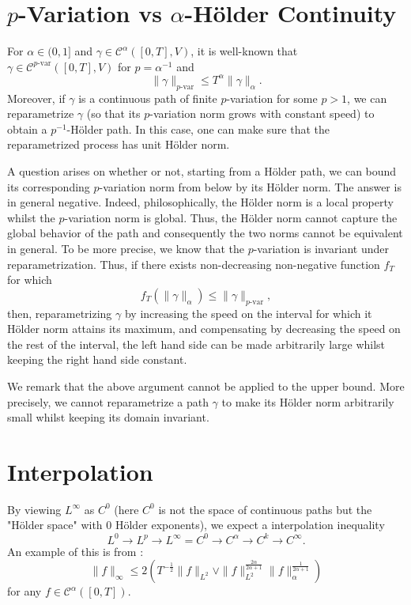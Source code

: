 \documentclass[]{article}
\theoremstyle{definition}
\theoremstyle{definition}
\def\pvar{p\mathrm{\text{-}var}}
\begin{document}



\section*{\(p\)-Variation vs \(\alpha\)-H\"older Continuity}

For \(\alpha \in (0, 1]\) and \(\gamma \in \mathcal{C}^\alpha([0, T], V)\), it is well-known that 
\(\gamma \in \mathcal{C}^{\pvar}([0, T], V)\) for \(p = \alpha^{-1}\) and 
\[\|\gamma\|_{\pvar} \le T^\alpha \|\gamma\|_\alpha.\]
Moreover, if \(\gamma\) is a continuous path of finite \(p\)-variation for some \(p > 1\), we 
can reparametrize \(\gamma\) (so that its \(p\)-variation norm grows with constant speed) to 
obtain a \(p^{-1}\)-H\"older path. In this case, one can make sure that the reparametrized process 
has unit H\"older norm. 

A question arises on whether or not, starting from a H\"older path, we can bound its corresponding 
\(p\)-variation norm from below by its H\"older norm. The answer is in general negative. Indeed, 
philosophically, the H\"older norm is a local property whilst the \(p\)-variation norm is global. 
Thus, the H\"older norm cannot capture the global behavior of the path and consequently the two 
norms cannot be equivalent in general. To be more precise, we know that the \(p\)-variation is 
invariant under reparametrization. Thus, if there exists non-decreasing non-negative function \(f_T\) for which 
\[f_T(\|\gamma\|_{\alpha}) \le \|\gamma\|_{\pvar},\]
then, reparametrizing \(\gamma\) by increasing the speed on the interval for which it H\"older norm 
attains its maximum, and compensating by decreasing the speed on the rest of the interval, the 
left hand side can be made arbitrarily large whilst keeping the right hand side constant. 

We remark that the above argument cannot be applied to the upper bound. More precisely, we cannot 
reparametrize a path \(\gamma\) to make its H\"older norm arbitrarily small whilst keeping its 
domain invariant. 

\section*{Interpolation}

By viewing \(L^\infty\) as \(C^0\) (here \(C^0\) is not the space of continuous paths but the 
"H\"older space" with 0 H\"older exponents), we expect a interpolation inequality 
\[L^0 \to L^p \to L^\infty = C^0 \to C^\alpha \to C^k \to C^\infty.\]
An example of this is from \cite[Lemma A.3]{Hairer:10}:
\[\|f\|_\infty \le 2 \left(T^{-\frac{1}{2}} \|f\|_{L^2} \vee 
  \|f\|_{L^2}^{\frac{2\alpha}{2\alpha + 1}} \|f\|_{\alpha}^{\frac{1}{2\alpha + 1}}\right)\]
for any \(f \in \mathcal{C}^\alpha([0, T])\).
\end{document}
